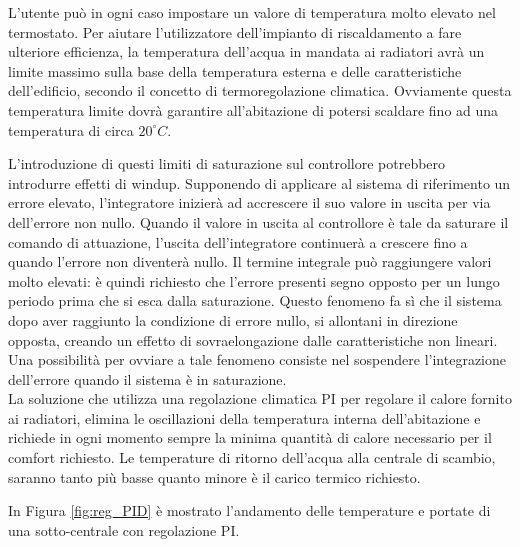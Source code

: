 \documentclass[laurea,oneside,11pt]{USiena_tesiLM}
\begin{document}
L'utente può in ogni caso impostare un valore di temperatura molto elevato nel termostato. Per aiutare l'utilizzatore dell'impianto di riscaldamento a fare ulteriore efficienza, la temperatura dell'acqua in mandata ai radiatori avrà un limite massimo sulla base della temperatura esterna e delle caratteristiche dell'edificio, secondo il concetto di termoregolazione climatica. 
Ovviamente questa temperatura limite dovrà garantire all'abitazione di potersi scaldare fino ad una temperatura di circa $20 ^{\circ}C$.

L'introduzione di questi limiti di saturazione sul controllore potrebbero introdurre effetti di windup.
Supponendo di applicare al sistema di riferimento un errore elevato, l'integratore inizierà ad accrescere il suo valore in uscita per via dell'errore non nullo. Quando il valore in uscita al controllore è tale da saturare il comando di attuazione, l'uscita dell'integratore continuerà a crescere fino a quando l'errore non diventerà nullo.
Il termine integrale può raggiungere valori molto elevati: è quindi richiesto che l'errore presenti segno opposto per un lungo periodo prima che si esca dalla saturazione. 
Questo fenomeno fa sì che il sistema dopo aver raggiunto la condizione di errore nullo, si allontani in direzione opposta, creando un effetto di sovraelongazione dalle caratteristiche non lineari. Una possibilità per ovviare a tale fenomeno consiste nel sospendere l'integrazione dell'errore quando il sistema è in saturazione.\\


La soluzione che utilizza una regolazione climatica PI per regolare il calore fornito ai radiatori, elimina le oscillazioni della temperatura interna dell'abitazione e richiede in ogni momento sempre la minima quantità di calore necessario per il comfort richiesto. Le temperature di ritorno dell'acqua alla centrale di scambio, saranno tanto più basse quanto minore è il carico termico richiesto. 

In Figura \ref{fig:reg_PID} è mostrato l'andamento delle temperature e portate di una sotto-centrale con regolazione PI.
\end{document}
